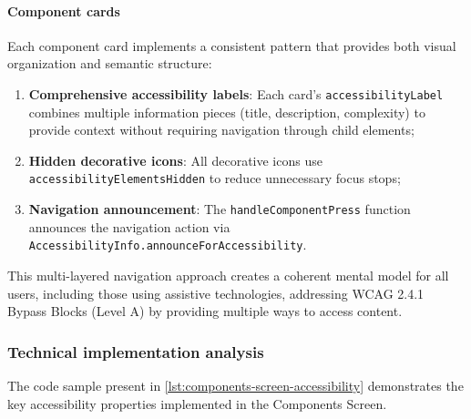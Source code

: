 \paragraph{Component cards}

Each component card implements a consistent pattern that provides both visual organization and semantic structure:

\begin{enumerate}
    \item \textbf{Comprehensive accessibility labels}: Each card's \texttt{accessibilityLabel} combines multiple information pieces (title, description, complexity) to provide context without requiring navigation through child elements;
    
    \item \textbf{Hidden decorative icons}: All decorative icons use \texttt{accessibilityElementsHidden} to reduce unnecessary focus stops;
    
    \item \textbf{Navigation announcement}: The \texttt{handleComponentPress} function announces the navigation action via \texttt{AccessibilityInfo.announceForAccessibility}.
\end{enumerate}

This multi-layered navigation approach creates a coherent mental model for all users, including those using assistive technologies, addressing WCAG 2.4.1 Bypass Blocks (Level A) by providing multiple ways to access content.

\subsubsection{Technical implementation analysis}

The code sample present in \ref{lst:components-screen-accessibility} demonstrates the key accessibility properties implemented in the Components Screen.

